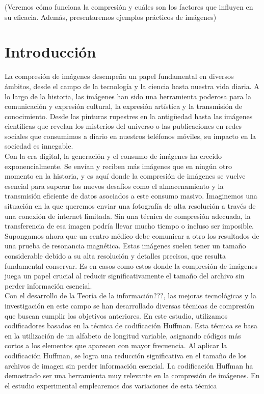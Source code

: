 \documentclass[12pt,a4paper]{article}
\begin{document}
(Veremos cómo funciona la compresión y cuáles son los factores que influyen en su eficacia. Además, presentaremos ejemplos prácticos de imágenes)


\newpage
\section{Introducción}
La compresión de imágenes desempeña un papel fundamental en diversos ámbitos, desde el campo de la tecnología y la ciencia hasta nuestra vida diaria. A lo largo de la historia, las imágenes han sido una herramienta poderosa para la comunicación y expresión cultural, la expresión artística y la transmisión de conocimiento. Desde las pinturas rupestres en la antigüedad hasta las imágenes científicas que revelan los misterios del universo o las publicaciones en redes sociales que consumimos a diario en nuestros teléfonos móviles, su impacto en la sociedad es innegable.\\

Con la era digital, la generación y el consumo de imágenes ha crecido exponencialmente. Se envían y reciben más imágenes que en ningún otro momento en la historia, y es aquí donde la compresión de imágenes se vuelve esencial para superar los nuevos desafíos como el almacenamiento y la transmisión eficiente de datos asociados a este consumo masivo. Imaginemos una situación en la que queremos enviar una fotografía de alta resolución a través de una conexión de internet limitada. Sin una técnica de compresión adecuada, la transferencia de esa imagen podría llevar mucho tiempo o incluso ser imposible. Supongamos ahora que un centro médico debe comunicar a otro los resultados de una prueba de resonancia magnética. Estas imágenes suelen tener un tamaño considerable debido a su alta resolución y detalles precisos, que resulta fundamental conservar. Es en casos como estos donde la compresión de imágenes juega un papel crucial al reducir significativamente el tamaño del archivo sin perder información esencial.\\

Con el desarrollo de la Teoría de la información???, las mejoras tecnológicas y la investigación en este campo se han desarrollado diversas técnicas de compresión que buscan cumplir los objetivos anteriores. En este estudio, utilizamos codificadores basados en la técnica de codificación Huffman. Esta técnica se basa en la utilización de un alfabeto de longitud variable, asignando códigos más cortos a los elementos que aparecen con mayor frecuencia. Al aplicar la codificación Huffman, se logra una reducción significativa en el tamaño de los archivos de imagen sin perder información esencial. La codificación Huffman ha demostrado ser una herramienta muy relevante en la compresión de imágenes. En el estudio experimental emplearemos dos variaciones de esta técnica \\
\end{document}
